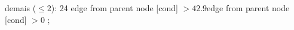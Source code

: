 {{{%
demais ($\leq 2$): 24} edge from parent node [cond] {$>42.9$}}edge from parent node [cond] {$>0$}}
;